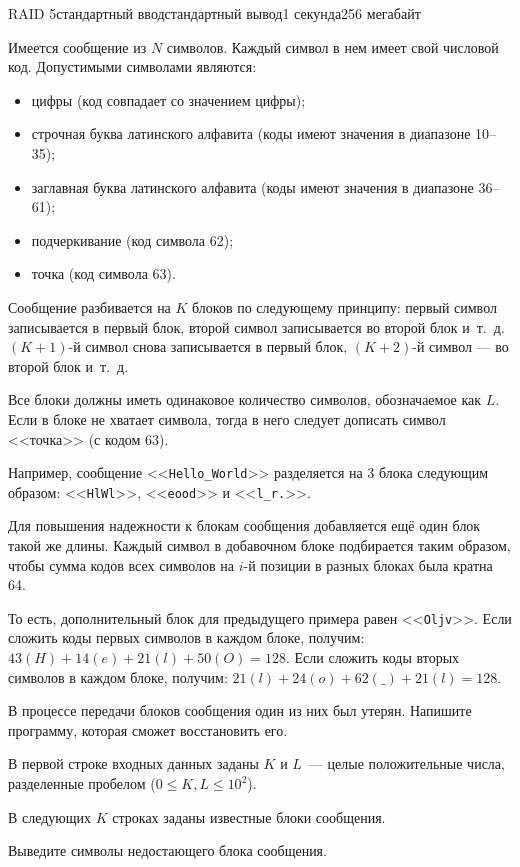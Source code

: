 \begin{problem}{RAID 5}{стандартный ввод}{стандартный вывод}{1 секунда}{256 мегабайт}

Имеется сообщение из $N$ символов. Каждый символ в нем имеет свой числовой код. Допустимыми символами являются:
\begin{itemize}\setlength\itemsep{0pt}
\item цифры (код совпадает со значением цифры);
\item строчная буква латинского алфавита (коды имеют значения в диапазоне 10--35);
\item заглавная буква латинского алфавита (коды имеют значения в диапазоне 36--61);
\item подчеркивание (код символа 62);
\item точка (код символа 63).
\end{itemize}

Сообщение разбивается на $K$ блоков по следующему принципу: первый символ записывается в первый блок, второй символ записывается во второй блок и~т.~д. $(K+1)$-й символ снова записывается в первый блок, $(K+2)$-й символ --- во второй блок и~т.~д.

Все блоки должны иметь одинаковое количество символов, обозначаемое как $L$. Если в блоке не хватает символа, тогда в него следует дописать символ <<точка>> (с кодом 63).

Например, сообщение <<\texttt{Hello\_World}>> разделяется на 3 блока следующим образом: <<\texttt{HlWl}>>, <<\texttt{eood}>> и <<\texttt{l\_r.}>>.

Для повышения надежности к блокам сообщения добавляется ещё один блок такой же длины. Каждый символ в добавочном блоке подбирается таким образом, чтобы сумма кодов всех символов на $i$-й позиции в разных блоках была кратна 64.

То есть, дополнительный блок для предыдущего примера равен <<\texttt{Oljv}>>. Если сложить коды первых символов в каждом блоке, получим: $43(H) + 14(e) + 21(l) + 50(O) = 128$. Если сложить коды вторых символов в каждом блоке, получим: $21(l) + 24(o) + 62(\_) + 21(l) = 128$.

В процессе передачи блоков сообщения один из них был утерян. Напишите программу, которая сможет восстановить его.


\InputFile
В первой строке входных данных заданы $K$ и $L$~--- целые положительные числа, разделенные пробелом ($0 \leq K, L \leq 10^2$).

В следующих $K$ строках заданы известные блоки сообщения.

\OutputFile
Выведите символы недостающего блока сообщения.

\Example

\begin{example}
%
\end{example}

\end{problem}

